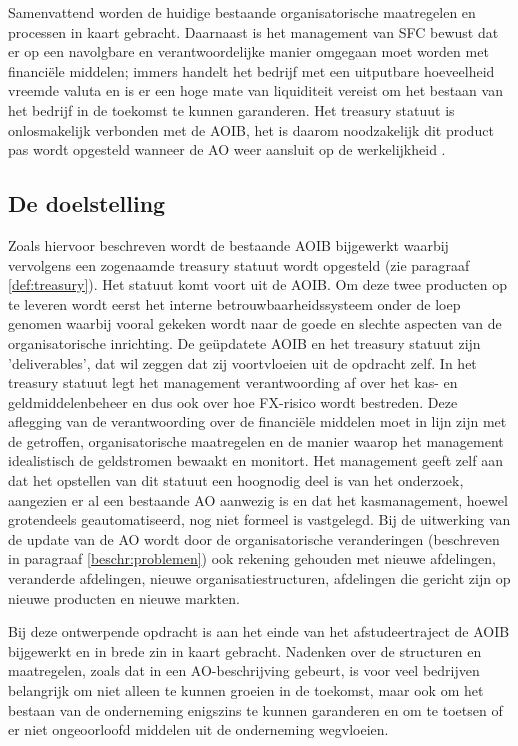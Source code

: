 Samenvattend worden de huidige bestaande organisatorische maatregelen en processen in kaart gebracht. Daarnaast is het management van SFC bewust dat er op een navolgbare en verantwoordelijke manier omgegaan moet worden met financiële middelen; immers handelt het bedrijf met een uitputbare hoeveelheid vreemde valuta en is er een hoge mate van liquiditeit vereist om het bestaan van het bedrijf in de toekomst te kunnen garanderen. Het treasury statuut is onlosmakelijk verbonden met de AOIB, het is daarom noodzakelijk dit product pas wordt opgesteld wanneer de AO weer aansluit op de werkelijkheid \citep{watisonderzoek,buunk,financiering}.

\subsection{De doelstelling}
Zoals hiervoor beschreven wordt de bestaande AOIB bijgewerkt waarbij vervolgens een zogenaamde treasury statuut wordt opgesteld (zie paragraaf \ref{def:treasury}). Het statuut komt voort uit de AOIB. 
Om deze twee producten op te leveren wordt eerst het interne betrouwbaarheidssysteem onder de loep genomen waarbij vooral gekeken wordt naar de goede en slechte aspecten van de organisatorische inrichting. De geüpdatete AOIB en het treasury statuut zijn 'deliverables', dat wil zeggen dat zij voortvloeien uit de opdracht zelf. In het treasury statuut legt het management verantwoording af over het kas- en geldmiddelenbeheer en dus ook over hoe FX-risico wordt bestreden. Deze aflegging van de verantwoording over de financiële middelen moet in lijn zijn met de getroffen, organisatorische maatregelen en de manier waarop het management idealistisch de geldstromen bewaakt en monitort. Het management geeft zelf aan dat het opstellen van dit statuut een hoognodig deel is van het onderzoek, aangezien er al een bestaande AO aanwezig is en dat het kasmanagement, hoewel grotendeels geautomatiseerd, nog niet formeel is vastgelegd. Bij de uitwerking van de update van de AO wordt door de organisatorische veranderingen (beschreven in paragraaf \ref{beschr:problemen}) ook rekening gehouden met nieuwe afdelingen, veranderde afdelingen, nieuwe organisatiestructuren, afdelingen die gericht zijn op nieuwe producten en nieuwe markten.

Bij deze ontwerpende opdracht is aan het einde van het afstudeertraject de AOIB bijgewerkt en in brede zin in kaart gebracht. Nadenken over de structuren en maatregelen, zoals dat in een AO-beschrijving gebeurt, is voor veel bedrijven belangrijk om niet alleen te kunnen groeien in de toekomst, maar ook om het bestaan van de onderneming enigszins te kunnen garanderen en om te toetsen of er niet ongeoorloofd middelen uit de onderneming wegvloeien.


